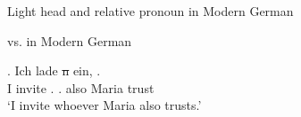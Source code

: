 \documentclass[xcolor=dvipsnames,10pt]{beamer}
\begin{document}
\begin{frame}[t]{Light head and relative pronoun in Modern German}
\begin{multicols}{2}
\end{multicols}

\end{frame}







\begin{frame}[t]{ vs.  in Modern German}

\pause

\exg. Ich lade \sout{n} ein,    .\\
I invite\scsub{[acc]} . {} . also Maria trust\scsub{[dat]}\\
`I invite whoever Maria also trusts.' \label{ex:mg-acc-dat-rep}

\pause


\end{frame}
\end{document}
